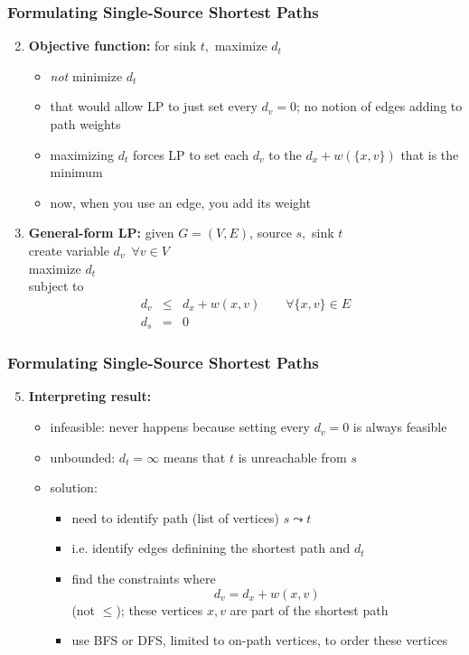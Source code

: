 \documentclass{beamer}
\begin{document}
\begin{frame} \frametitle{Formulating Single-Source Shortest Paths}
\begin{enumerate}
  \setcounter{enumi}{1}
  \item \textbf{Objective function:} for sink $t,$ maximize $d_t$
\begin{itemize}
  \item \emph{not} minimize $d_t$
  \item that would allow LP to just set every $d_v = 0$; no notion of
    edges adding to path weights
  \item maximizing $d_t$ forces LP to set each $d_v$ to the
    $d_x + w(\{x, v\})$ that is the minimum
  \item now, when you use an edge, you add its weight
\end{itemize}
\setcounter{enumi}{3}
\item \textbf{General-form LP:} given $G=(V, E)$, source $s,$ sink $t$ \\
create variable $d_v \enspace \forall v \in V$ \\
maximize $d_t$ \\
subject to
\begin{eqnarray*}
  d_v &\leq& d_x + w(x, v) \qquad \forall \{x, v \} \in E \\
  d_s &=& 0
\end{eqnarray*}
\end{enumerate}
\end{frame}

\begin{frame} \frametitle{Formulating Single-Source Shortest Paths}
  \begin{enumerate}
    \setcounter{enumi}{4}
    \item \textbf{Interpreting result:}
    \begin{itemize}
      \item infeasible: never happens because setting every $d_v=0$ is always feasible
      \item unbounded: $d_t = \infty$ means that $t$ is unreachable from $s$
      \item solution:
      \begin{itemize}
        \item need to identify path (list of vertices) $s \leadsto t$
        \item i.e. identify edges definining the shortest path and $d_t$
        \item find the constraints where
        \[ d_v = d_x + w(x, v) \]
        (not $\leq$); these vertices $x, v$ are part of the shortest path
        \item use BFS or DFS, limited to on-path vertices, to order these vertices
      \end{itemize}
    \end{itemize}
  \end{enumerate}
\end{frame}
\end{document}
